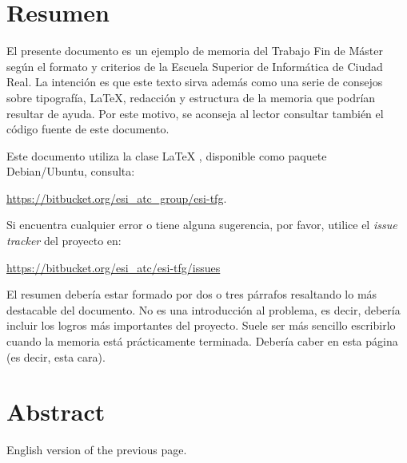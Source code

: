 \chapter{Resumen}

El presente documento es un ejemplo de memoria del Trabajo Fin de Máster según
el formato y criterios de la Escuela Superior de Informática de Ciudad Real. La
intención es que este texto sirva además como una serie de consejos sobre
tipografía, \LaTeX, redacción y estructura de la memoria que podrían resultar de
ayuda. Por este motivo, se aconseja al lector consultar también el código fuente
de este documento.

Este documento utiliza la clase \LaTeX{} \esitfm{}, disponible como paquete
Debian/Ubuntu, consulta:

 \url{https://bitbucket.org/esi_atc_group/esi-tfg}.

Si encuentra cualquier error o tiene alguna sugerencia, por favor, utilice
el \emph{issue tracker} del proyecto \esitfm{} en:

\url{https://bitbucket.org/esi_atc/esi-tfg/issues}

El resumen debería estar formado por dos o tres párrafos resaltando lo más
destacable del documento. No es una introducción al problema, es decir, debería
incluir los logros más importantes del proyecto. Suele ser más sencillo
escribirlo cuando la memoria está prácticamente terminada. Debería caber en esta
página (es decir, esta cara).


\chapter{Abstract}

English version of the previous page.
